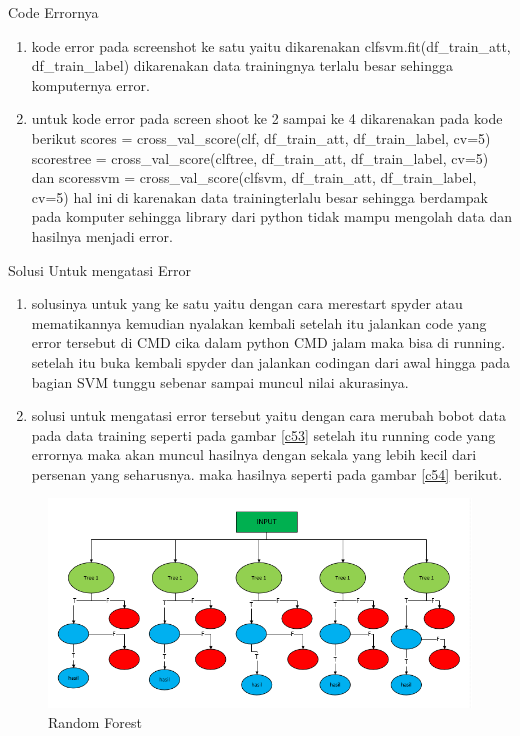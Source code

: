 Code Errornya 
\begin{enumerate}
\item kode error pada screenshot ke satu yaitu dikarenakan clfsvm.fit(df\_train\_att, df\_train\_label) dikarenakan data trainingnya terlalu besar sehingga komputernya error.
\item untuk kode error pada screen shoot ke 2 sampai ke 4 dikarenakan pada kode berikut  scores = cross\_val\_score(clf, df\_train\_att, df\_train\_label, cv=5) scorestree = cross\_val\_score(clftree, df\_train\_att, df\_train\_label, cv=5) dan  
scoressvm = cross\_val\_score(clfsvm, df\_train\_att, df\_train\_label, cv=5) hal ini di karenakan data trainingterlalu besar sehingga berdampak pada komputer sehingga library dari python tidak mampu mengolah data dan hasilnya menjadi error. 
\end{enumerate}

Solusi Untuk mengatasi Error
\begin{enumerate}
\item solusinya untuk yang ke satu yaitu dengan cara merestart spyder atau mematikannya kemudian nyalakan kembali setelah itu jalankan code yang error tersebut di CMD cika dalam python CMD jalam maka bisa di running. setelah itu buka kembali spyder dan jalankan codingan dari awal hingga pada bagian SVM tunggu sebenar sampai muncul nilai akurasinya.
\item solusi untuk mengatasi error tersebut yaitu dengan cara merubah bobot data pada data training seperti pada gambar \ref{c53}
setelah itu running code yang errornya maka akan muncul hasilnya dengan sekala yang lebih kecil dari persenan yang seharusnya. maka hasilnya seperti pada gambar \ref{c54} berikut.
\end{enumerate}


\begin{figure}
      \centerline{\includegraphics[width=1\textwidth]
      {figures/cokro/c36}}
      \caption{Random Forest}
      \label{c36}
      \end{figure}


